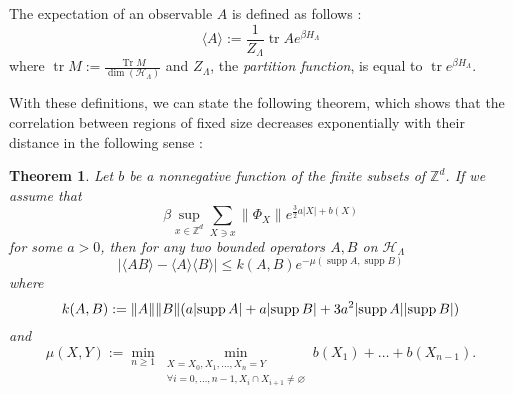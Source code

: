 \documentclass[french]{article}
\DeclarePairedDelimiter\abs{\lvert}{\rvert}
\newtheorem{thm}{Theorem}
\DeclareMathOperator{\Tr}{Tr}
\DeclareMathOperator{\tr}{tr}
\DeclareMathOperator{\supp}{supp}
\begin{document}
 The expectation of an observable $A$ is defined as follows :
 $$
 \langle A \rangle := \frac{1}{Z_\Lambda}\tr Ae^{\beta H_\Lambda}
 $$
 where $\tr M:=\frac{\Tr M}{\dim(\mathcal H_\Lambda)}$ and $Z_\Lambda$, the {\it partition function}, is equal to $\tr e^{\beta H_\Lambda}$.
 
 With these definitions, we can state the following theorem, which shows that the correlation between regions of fixed size decreases exponentially with their distance in the following sense :
 \begin{thm}
     Let $b$ be a nonnegative function of the finite subsets of $\mathbb Z^d$.
     If we assume that 
     $$\beta\sup_{x\in\mathbb Z^d}\sum_{X\ni x}\lVert\Phi_X\rVert e^{\frac{3}{2}a|X|+b(X)}$$ 
     for some $a>0$, then for any two bounded operators $A,B$ on $\mathcal H_\Lambda$
     $$|\langle AB\rangle - \langle A\rangle\langle B\rangle|\leq k(A,B)e^{-\mu(\supp A,\supp B)}$$
     where $$k(A,B):=\lVert A\rVert\lVert B\rVert(a\abs{\supp A}+a\abs{\supp B} + 3a^2\abs{\supp A}\abs{\supp B})$$ and 
     $$
     \mu(X,Y):= \min_{n\geq 1} \min_{\substack{X=X_0,X_1,\ldots,X_n=Y \\ \forall i=0,\ldots,n-1, X_i\cap X_{i+1}\neq \varnothing}} b(X_1)+\ldots+b(X_{n-1}).
     $$
 \end{thm}
\end{document}

